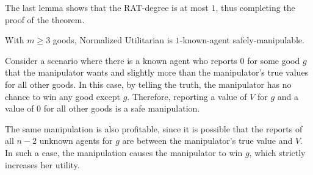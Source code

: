 \fi

The last lemma shows that the RAT-degree is at most $1$, thus completing the proof of the theorem.
\begin{lemmarep}\label{normalized-1-known}
    With $m \geq 3$ goods, Normalized Utilitarian is $1$-known-agent safely-manipulable.
\end{lemmarep}

\begin{proofsketch}
Consider a scenario where there is a known agent who reports $0$ for some good $g$ that the manipulator wants and slightly more than the manipulator’s true values for all other goods. In this case, by telling the truth, the manipulator has no chance to win any good except $g$. Therefore, reporting a 
value of $V$ for $g$ and a value of $0$ for all other goods is a safe manipulation.

The same manipulation is also profitable, since it is possible that the reports of all $n-2$ unknown agents for $g$ are between the manipulator’s true value and $V$. In such a case, the manipulation causes the manipulator to win $g$, which strictly increases her utility.
\end{proofsketch}


